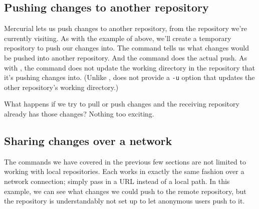 \subsection{Pushing changes to another repository}

Mercurial lets us push changes to another repository, from the
repository we're currently visiting.  As with the example of
 above, we'll create a temporary repository to push our
changes into.
The  command tells us what changes would be pushed
into another repository.
And the  command does the actual push.
As with , the  command does not update the
working directory in the repository that it's pushing changes into.
(Unlike ,  does not provide a \texttt{-u}
option that updates the other repository's working directory.)

What happens if we try to pull or push changes and the receiving
repository already has those changes?  Nothing too exciting.

\subsection{Sharing changes over a network}

The commands we have covered in the previous few sections are not
limited to working with local repositories.  Each works in exactly the
same fashion over a network connection; simply pass in a URL instead
of a local path.
In this example, we can see what changes we could push to the remote
repository, but the repository is understandably not set up to let
anonymous users push to it.

